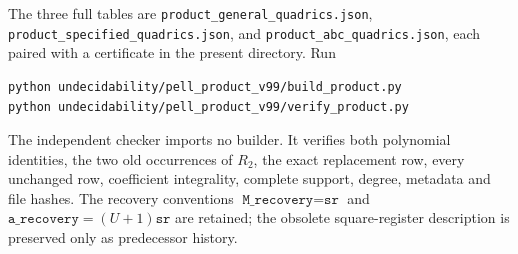 \documentclass[11pt]{article}
\begin{document}
The three full tables are \nolinkurl{product_general_quadrics.json},
\nolinkurl{product_specified_quadrics.json}, and
\nolinkurl{product_abc_quadrics.json}, each paired with a certificate
in the present directory. Run
\begin{verbatim}
python undecidability/pell_product_v99/build_product.py
python undecidability/pell_product_v99/verify_product.py
\end{verbatim}
The independent checker imports no builder. It verifies both polynomial
identities, the two old occurrences of \(R_2\), the exact replacement
row, every unchanged row, coefficient integrality, complete support,
degree, metadata and file hashes. The recovery conventions
\(\texttt{M\_recovery}=\texttt{sr}\) and
\(\texttt{a\_recovery}=(U+1)\texttt{sr}\) are retained; the obsolete
square-register description is preserved only as predecessor history.
\end{document}

